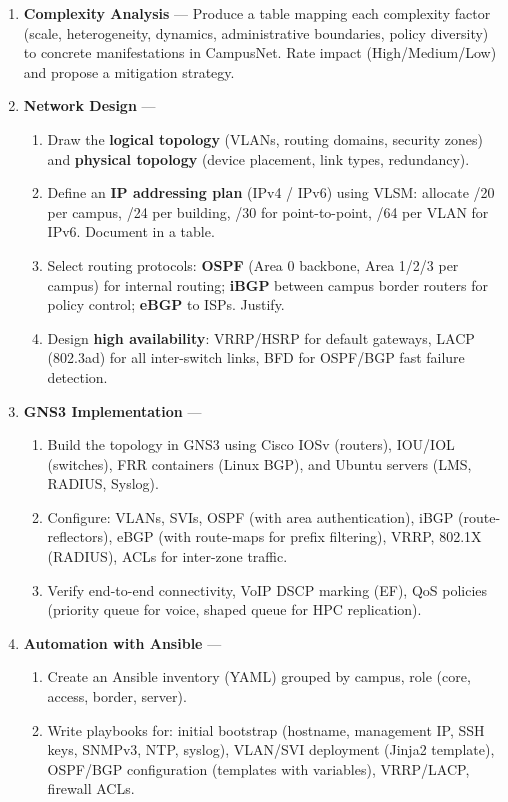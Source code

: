 \documentclass[11pt]{article}
\newcommand{\cle}[1]{{\popxbold\color{popdark}#1}}
\newcounter{popsec}
\newcounter{popsub}
\newcommand{\courssub}[1]{%
  \stepcounter{popsub}%
  \par\vspace{9pt}\noindent{\popxbold\fontsize{11.5}{13}\selectfont\color{popink}{\color{poporange}\thepopsec.\thepopsub}\hspace{6pt}#1}\par\nopagebreak\vspace{4pt}
}
\begin{document}
\courssub{Tasks}
\begin{enumerate}
    \item \textbf{Complexity Analysis} — Produce a table mapping each \cle{complexity factor} (scale, heterogeneity, dynamics, administrative boundaries, policy diversity) to concrete manifestations in CampusNet. Rate impact (High/Medium/Low) and propose a mitigation strategy.
    \item \textbf{Network Design} —
    \begin{enumerate}
        \item Draw the \textbf{logical topology} (VLANs, routing domains, security zones) and \textbf{physical topology} (device placement, link types, redundancy).
        \item Define an \textbf{IP addressing plan} (IPv4 / IPv6) using VLSM: allocate /20 per campus, /24 per building, /30 for point-to-point, /64 per VLAN for IPv6. Document in a table.
        \item Select routing protocols: \textbf{OSPF} (Area 0 backbone, Area 1/2/3 per campus) for internal routing; \textbf{iBGP} between campus border routers for policy control; \textbf{eBGP} to ISPs. Justify.
        \item Design \textbf{high availability}: VRRP/HSRP for default gateways, LACP (802.3ad) for all inter-switch links, BFD for OSPF/BGP fast failure detection.
    \end{enumerate}
    \item \textbf{GNS3 Implementation} —
    \begin{enumerate}
        \item Build the topology in GNS3 using Cisco IOSv (routers), IOU/IOL (switches), FRR containers (Linux BGP), and Ubuntu servers (LMS, RADIUS, Syslog).
        \item Configure: VLANs, SVIs, OSPF (with area authentication), iBGP (route-reflectors), eBGP (with route-maps for prefix filtering), VRRP, 802.1X (RADIUS), ACLs for inter-zone traffic.
        \item Verify end-to-end connectivity, VoIP DSCP marking (EF), QoS policies (priority queue for voice, shaped queue for HPC replication).
    \end{enumerate}
    \item \textbf{Automation with Ansible} —
    \begin{enumerate}
        \item Create an Ansible inventory (YAML) grouped by campus, role (core, access, border, server).
        \item Write playbooks for: initial bootstrap (hostname, management IP, SSH keys, SNMPv3, NTP, syslog), VLAN/SVI deployment (Jinja2 template), OSPF/BGP configuration (templates with variables), VRRP/LACP, firewall ACLs.

\end{enumerate}
\end{enumerate}
\end{document}
